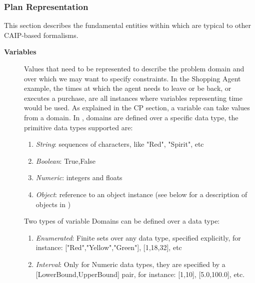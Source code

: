\subsubsection{\eu Plan Representation}
\label{sec:europa:pr}


This section describes the fundamental entities within \eu which are
typical to other CAIP-based formalisms.

\begin{description}

\item[\textbf{Variables}] Values that need to be represented to
  describe the problem domain and over which we may want to specify
  constraints. In the Shopping Agent example, the times at which the
  agent needs to leave or be back, or executes a purchase, are all
  instances where variables representing time would be used.  As
  explained in the \textsf{CP} section, a variable can take values
  from a domain. In \eu, domains are defined over a specific data
  type, the primitive data types supported are:

  \begin{enumerate}
  \item \textit{String}: sequences of characters, like "Red",
    "Spirit", etc

  \item \textit{Boolean}: {True,False}

  \item \textit{Numeric}: integers and floats

  \item \textit{Object}: reference to an object instance (see below
    for a description of objects in \eu)
  
\end {enumerate}

Two types of variable Domains can be defined over a data type:

  \begin{enumerate}
  \item \textit{Enumerated}: Finite sets over any data type, specified
    explicitly, for instance: ["Red","Yellow","Green"], [1,18,32], etc
  \item \textit{Interval}: Only for Numeric data types, they are
    specified by a [LowerBound,UpperBound] pair, for instance: [1,10],
    [5.0,100.0], etc.
  \end {enumerate}


\end{description}
